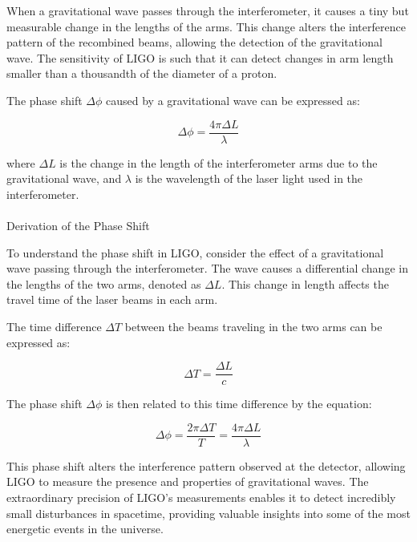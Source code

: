 \documentclass[
  a4paper,
]{book}
\makeatletter
\let\oldparagraph\paragraph
\renewcommand{\paragraph}{
    \@ifstar
      \xxxParagraphStar
      \xxxParagraphNoStar
  }
\newcommand{\xxxParagraphStar}[1]{\oldparagraph*{#1}\mbox{}}
\newcommand{\xxxParagraphNoStar}[1]{\oldparagraph{#1}\mbox{}}
\makeatother
\begin{document}
When a gravitational wave passes through the interferometer, it causes a
tiny but measurable change in the lengths of the arms. This change
alters the interference pattern of the recombined beams, allowing the
detection of the gravitational wave. The sensitivity of LIGO is such
that it can detect changes in arm length smaller than a thousandth of
the diameter of a proton.

The phase shift \(\Delta \phi\) caused by a gravitational wave can be
expressed as:

\[
\Delta \phi = \frac{4 \pi \Delta L}{\lambda}
\]

where \(\Delta L\) is the change in the length of the interferometer
arms due to the gravitational wave, and \(\lambda\) is the wavelength of
the laser light used in the interferometer.

\paragraph{Derivation of the Phase
Shift}\label{derivation-of-the-phase-shift}

To understand the phase shift in LIGO, consider the effect of a
gravitational wave passing through the interferometer. The wave causes a
differential change in the lengths of the two arms, denoted as
\(\Delta L\). This change in length affects the travel time of the laser
beams in each arm.

The time difference \(\Delta T\) between the beams traveling in the two
arms can be expressed as:

\[
\Delta T = \frac{\Delta L}{c}
\]

The phase shift \(\Delta \phi\) is then related to this time difference
by the equation:

\[
\Delta \phi = \frac{2 \pi \Delta T}{T} = \frac{4 \pi \Delta L}{\lambda}
\]

This phase shift alters the interference pattern observed at the
detector, allowing LIGO to measure the presence and properties of
gravitational waves. The extraordinary precision of LIGO's measurements
enables it to detect incredibly small disturbances in spacetime,
providing valuable insights into some of the most energetic events in
the universe.
\end{document}

